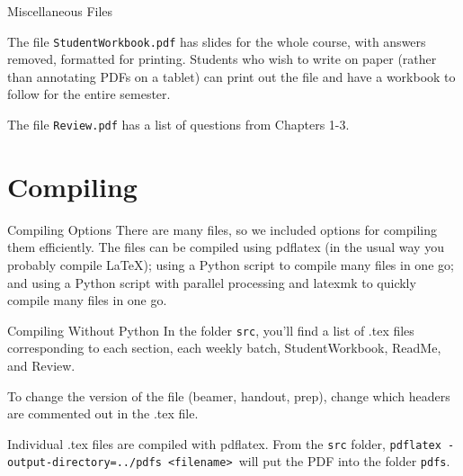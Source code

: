 \documentclass[10pt]{beamer}
\begin{document}
\begin{frame}{Miscellaneous Files}

The file \texttt{StudentWorkbook.pdf} has slides for the whole course, with answers removed, formatted for printing. Students who wish to write on paper (rather than annotating PDFs on a tablet) can print out the file and have a workbook to follow for the entire semester.\vfill

The file \texttt{Review.pdf} has a list of questions from Chapters 1-3.
\vfill

\end{frame}
\section{Compiling}
\frame{\tableofcontents[currentsection]}
\begin{frame}{Compiling Options}
There are many files, so we included options for compiling them efficiently. The files can be compiled using pdflatex (in the usual way you probably compile LaTeX); using a Python script to compile many files in one go; and using a Python script with parallel processing and latexmk to quickly compile many files in one go.
\end{frame}
\begin{frame}{Compiling Without Python}
In the folder \texttt{src}, you'll find a list of .tex files corresponding to each section, each weekly batch, StudentWorkbook, ReadMe, and Review. 
\vfill

To change the version of the file (beamer, handout, prep), change which headers are commented out in the .tex file.

\vfill

Individual .tex files are compiled with pdflatex. From the \texttt{src} folder, \texttt{pdflatex -output-directory=../pdfs  <filename> }will put the PDF into the folder \texttt{pdfs}.
\end{frame}
\end{document}
